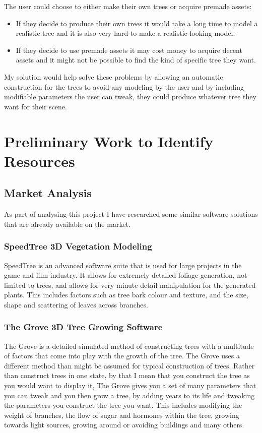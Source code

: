\documentclass[proposal]{cmpreport}
\begin{document}
The user could choose to either make their own trees or acquire premade assets:
\begin{itemize}
        \item If they decide to produce their own trees it would take a long time to 
              model a realistic tree and it is also very hard to make a realistic 
              looking model.
        \item If they decide to use premade assets it may cost money to acquire decent 
              assets and it might not be possible to find the kind of specific tree they 
              want. 
\end{itemize}

My solution would help solve these problems by allowing an automatic construction 
for the trees to avoid any modeling by the user and by including modifiable parameters 
the user can tweak, they could produce whatever tree they want for their scene.

\pagebreak
\section{Preliminary Work to Identify Resources}

\subsection{Market Analysis}
As part of analysing this project I have researched some similar software solutions 
that are already available on the market.

\subsubsection{SpeedTree 3D Vegetation Modeling}
SpeedTree \cite{speedtree} is an advanced software suite that is used for large projects 
in the game and film industry. It allows for extremely detailed foliage generation, 
not limited to trees, and allows for very minute detail manipulation for the generated 
plants. This includes factors such as tree bark colour and texture, and the size, shape 
and scattering of leaves across branches.

\subsubsection{The Grove 3D Tree Growing Software}
The Grove \cite{thegrove} is a detailed simulated method of constructing trees with a 
multitude of factors that come into play with the growth of the tree. The Grove uses a 
different method than might be assumed for typical construction of trees. Rather than 
construct trees in one state, by that I mean that you construct the tree as you would 
want to display it, The Grove gives you a set of many parameters that you can tweak and 
you then grow a tree, by adding years to its life and tweaking the parameters you 
construct the tree you want. This includes modifying the weight of branches, the flow 
of sugar and hormones within the tree, growing towards light sources, growing around 
or avoiding buildings and many others.
\end{document}
